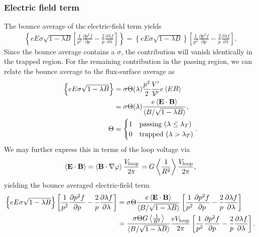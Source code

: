 \documentclass[11pt,a4paper]{article}
\newcommand{\sub}[1]{\ensuremath{_{\text{#1}}}}
\renewcommand{\b}[1]{\ensuremath{ {\bf #1 } }}
\begin{document}
\subsubsection*{Electric field term}
The bounce average of the electric-field term yields
\begin{align}
\left\{eE \sigma\sqrt{1-\lambda B}\left[\frac{1}{p^2}\frac{\partial p^2 f}{\partial p}  - \frac{2}{p}\frac{\partial \lambda f}{\partial \lambda}\right]  \right\} = \left\{eE \sigma\sqrt{1-\lambda B}\right\}\left[\frac{1}{p^2}\frac{\partial p^2 f}{\partial p}  - \frac{2}{p}\frac{\partial \lambda f}{\partial \lambda}\right].
\end{align}
Since the bounce average contains a $\sigma$, the contribution will vanish identically in the trapped region. For the remaining contribution in the passing region, we can relate the bounce average to the flux-surface average as
\begin{align}
\left\{eE \sigma\sqrt{1-\lambda B}\right\} &= \sigma \Theta(\lambda) \frac{p^2}{2}\frac{V'}{\mathcal{V}'}e\left\langle EB\right\rangle \nonumber \\
&= \sigma \Theta(\lambda) \frac{e \left\langle \b{E}\cdot\b{B}\right\rangle}{\langle B/\sqrt{1-\lambda B} \rangle}, \nonumber \\
\Theta &= \begin{cases}
1 & \text{passing} ~(\lambda \leq \lambda_T) \\
0 & \text{trapped} ~(\lambda > \lambda_T)
\end{cases}.
\end{align}
We may further express this in terms of the loop voltage via
\begin{align}
\langle \b{E}\cdot\b{B} \rangle =  \left\langle \b{B}\cdot\nabla \varphi \right\rangle \frac{V\sub{loop}}{2\pi} = G \left\langle\frac{1}{R^2}\right\rangle \frac{V\sub{loop}}{2\pi},
\end{align}
yielding the bounce averaged electric-field term
\begin{align}
 \left\{eE \sigma\sqrt{1-\lambda B}\right\}\left[\frac{1}{p^2}\frac{\partial p^2 f}{\partial p}  - \frac{2}{p}\frac{\partial \lambda f}{\partial \lambda}\right] &= \sigma \Theta \frac{e \left\langle \b{E}\cdot\b{B}\right\rangle}{\langle B/\sqrt{1-\lambda B} \rangle}\left[\frac{1}{p^2}\frac{\partial p^2 f}{\partial p}  - \frac{2}{p}\frac{\partial \lambda f}{\partial \lambda}\right]  \nonumber \\
&=\frac{\sigma \Theta G \left\langle\frac{1}{R^2}\right\rangle}{\langle B/\sqrt{1-\lambda B}\rangle} \frac{eV\sub{loop}}{2\pi}  \left[\frac{1}{p^2}\frac{\partial p^2 f}{\partial p}  - \frac{2}{p}\frac{\partial \lambda f}{\partial \lambda}\right] .
\end{align}
\end{document}
